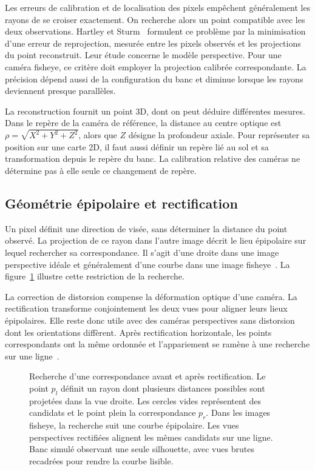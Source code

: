 \documentclass[11pt,a4paper]{article}
\begin{document}
Les erreurs de calibration et de localisation des pixels empêchent généralement les rayons de se croiser exactement. On recherche alors un point compatible avec les deux observations. Hartley et Sturm~\cite{hartley1997triangulation} formulent ce problème par la minimisation d'une erreur de reprojection, mesurée entre les pixels observés et les projections du point reconstruit. Leur étude concerne le modèle perspective. Pour une caméra fisheye, ce critère doit employer la projection calibrée correspondante. La précision dépend aussi de la configuration du banc et diminue lorsque les rayons deviennent presque parallèles.

La reconstruction fournit un point 3D, dont on peut déduire différentes mesures. Dans le repère de la caméra de référence, la distance au centre optique est $\rho=\sqrt{X^2+Y^2+Z^2}$, alors que $Z$ désigne la profondeur axiale. Pour représenter sa position sur une carte 2D, il faut aussi définir un repère lié au sol et sa transformation depuis le repère du banc. La calibration relative des caméras ne détermine pas à elle seule ce changement de repère.

\subsection{Géométrie épipolaire et rectification}
Un pixel définit une direction de visée, sans déterminer la distance du point observé. La projection de ce rayon dans l'autre image décrit le lieu épipolaire sur lequel rechercher sa correspondance. Il s'agit d'une droite dans une image perspective idéale et généralement d'une courbe dans une image fisheye~\cite{abraham2005}. La figure~\ref{fig:geometrie-stereo} illustre cette restriction de la recherche.

La correction de distorsion compense la déformation optique d'une caméra. La rectification transforme conjointement les deux vues pour aligner leurs lieux épipolaires. Elle reste donc utile avec des caméras perspectives sans distorsion dont les orientations diffèrent. Après rectification horizontale, les points correspondants ont la même ordonnée et l'appariement se ramène à une recherche sur une ligne~\cite{opencvcalib3d}.

\begin{figure}[H]
\centering

\caption{Recherche d'une correspondance avant et après rectification. Le point $p_l$ définit un rayon dont plusieurs distances possibles sont projetées dans la vue droite. Les cercles vides représentent des candidats et le point plein la correspondance $p_r$. Dans les images fisheye, la recherche suit une courbe épipolaire. Les vues perspectives rectifiées alignent les mêmes candidats sur une ligne. Banc simulé observant une seule silhouette, avec vues brutes recadrées pour rendre la courbe lisible.}
\label{fig:geometrie-stereo}
\end{figure}
\end{document}
